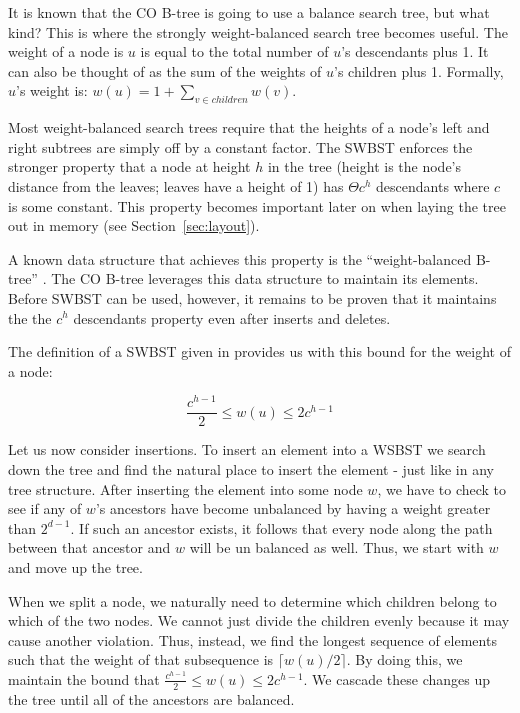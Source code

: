 \documentclass{style}
\begin{document}
It is known that the CO B-tree is going to use a balance search tree, but what
kind? This is where the strongly weight-balanced search tree becomes useful. The
weight of a node is $u$ is equal to the total number of $u$'s descendants plus
1. It can also be thought of as the sum of the weights of $u$'s children plus
1. Formally, $u$'s weight is: $w(u) = 1 + \sum_{v \in children} w(v)$.

Most weight-balanced search trees require that the heights of a node's
left and right subtrees are simply off by a constant factor. The SWBST enforces the
stronger property that a node at height $h$ in the tree (height is the node's
distance from the leaves; leaves have a height of 1) has $\Theta c^h$
descendants where $c$ is some constant. This property becomes important later
on when laying the tree out in memory (see Section~\ref{sec:layout}).

A known data structure that achieves this property is the ``weight-balanced
B-tree'' \cite{swbst}. The CO B-tree leverages this data structure to maintain
its elements. Before SWBST can be used, however, it remains to be proven that
it maintains the the $c^h$ descendants property even after inserts and
deletes.

The definition of a SWBST given in \cite{swbst} provides us with this bound for the
weight of a node:

\begin{equation}
\frac{c^{h-1}}{2} \leq w(u) \leq 2c^{h-1}
\end{equation}

Let us now consider insertions. To insert an element into a WSBST we search down
the tree and find the natural place to insert the element - just like in any
tree structure. After inserting the element into some node $w$, we have to
check to see if any of $w$'s ancestors have become unbalanced by having a
weight greater than $2^{d-1}$. If such an ancestor exists, it follows that
every node along the path between that ancestor and $w$ will be un balanced as
well. Thus, we start with $w$ and move up the tree.

When we split a node, we naturally need to determine which children belong to
which of the two nodes. We cannot just divide the children evenly because it
may cause another violation. Thus, instead, we find the longest sequence of
elements such that the weight of that subsequence is $\lceil w(u)/2 \rceil$.
By doing this, we maintain the bound that $\frac{c^{h-1}}{2} \leq w(u) \leq
2c^{h-1}$. We cascade these changes up the tree until all of the ancestors
are balanced.
\end{document}
